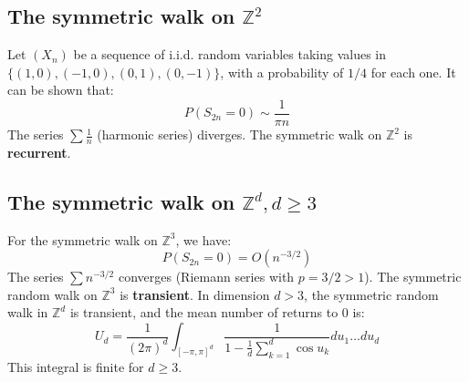 \subsection{The symmetric walk on $\mathbb{Z}^2$}%
Let $(X_n)$ be a sequence of i.i.d. random variables taking values in $\{(1,0), (-1,0), (0,1), (0,-1)\}$, with a probability of $1/4$ for each one.
It can be shown that:%
\begin{equation*}
    P(S_{2n}=0) \sim \frac{1}{\pi n}
\end{equation*}%
The series $\sum \frac{1}{n}$ (harmonic series) diverges. The symmetric walk on $\mathbb{Z}^2$ is \textbf{recurrent}.%
\subsection{The symmetric walk on $\mathbb{Z}^d, d \ge 3$}%
For the symmetric walk on $\mathbb{Z}^3$, we have:%
\begin{equation*}
    P(S_{2n}=0) = O(n^{-3/2})
\end{equation*}%
The series $\sum n^{-3/2}$ converges (Riemann series with $p=3/2 > 1$). The symmetric random walk on $\mathbb{Z}^3$ is \textbf{transient}.
In dimension $d>3$, the symmetric random walk in $\mathbb{Z}^d$ is transient, and the mean number of returns to 0 is:%
\begin{equation*}
    U_d = \frac{1}{(2\pi)^d} \int_{[-\pi,\pi]^d} \frac{1}{1-\frac{1}{d}\sum_{k=1}^d \cos u_k} d u_1 \dots d u_d
\end{equation*}%
This integral is finite for $d \ge 3$.